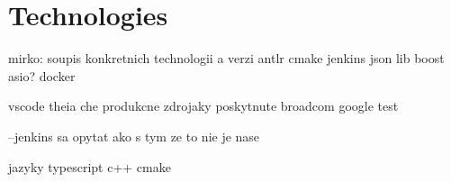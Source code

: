 \chapter{Technologies}

mirko: soupis konkretnich technologii a verzi
antlr
cmake
jenkins
json lib
boost asio?
docker

vscode 
theia
che
produkcne zdrojaky poskytnute broadcom
google test

--jenkins sa opytat ako s tym ze to nie je nase

jazyky
typescript 
c++
cmake